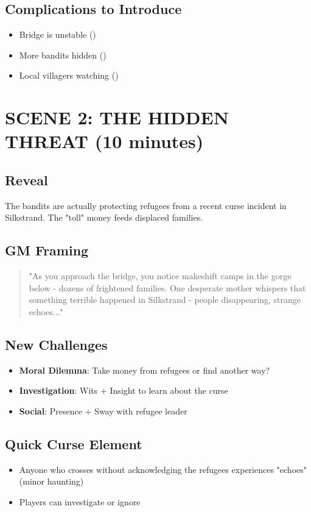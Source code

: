 \documentclass[11pt]{article}
\begin{document}
\subsection*{Complications to Introduce}
\begin{itemize}
\item Bridge is unstable ()
\item More bandits hidden ()
\item Local villagers watching ()
\end{itemize}

\section{SCENE 2: THE HIDDEN THREAT (10 minutes)}

\subsection*{Reveal}
The bandits are actually protecting refugees from a recent curse incident in Silkstrand. The "toll" money feeds displaced families.

\subsection*{GM Framing}
\begin{quote}
"As you approach the bridge, you notice makeshift camps in the gorge below - dozens of frightened families. One desperate mother whispers that something terrible happened in Silkstrand - people disappearing, strange echoes..."
\end{quote}

\subsection*{New Challenges}
\begin{itemize}
\item \textbf{Moral Dilemma}: Take money from refugees or find another way?
\item \textbf{Investigation}: Wits + Insight to learn about the curse
\item \textbf{Social}: Presence + Sway with refugee leader
\end{itemize}

\subsection*{Quick Curse Element}
\begin{itemize}
\item Anyone who crosses without acknowledging the refugees experiences "echoes" (minor haunting)
\item Players can investigate or ignore
\end{itemize}
\end{document}
